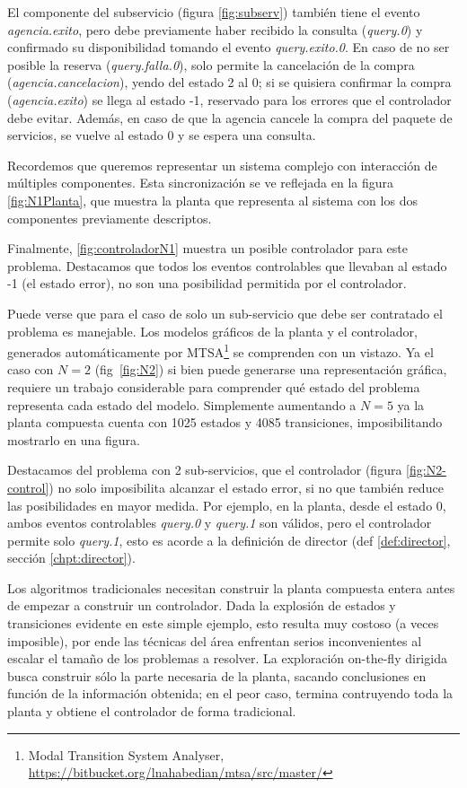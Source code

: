 El componente del subservicio (figura \ref{fig:subserv}) también tiene el evento \textit{agencia.exito}, pero debe previamente haber recibido la consulta (\textit{query.0}) y confirmado su disponibilidad tomando el evento \textit{query.exito.0}. En caso de no ser posible la reserva (\textit{query.falla.0}), solo permite la cancelación de la compra (\textit{agencia.cancelacion}), yendo del estado 2 al 0; si se quisiera confirmar la compra (\textit{agencia.exito}) se llega al estado -1, reservado para los errores que el controlador debe evitar. Además, en caso de que la agencia cancele la compra del paquete de servicios, se vuelve al estado 0 y se espera una consulta.

Recordemos que queremos representar un sistema complejo con interacción de múltiples componentes. Esta sincronización se ve reflejada en la figura \ref{fig:N1Planta}, que muestra la planta que representa al sistema con los dos componentes previamente descriptos. 

Finalmente, \ref{fig:controladorN1} muestra un posible controlador para este problema. Destacamos que todos los eventos controlables que llevaban al estado -1 (el estado error), no son una posibilidad permitida por el controlador. 

Puede verse que para el caso de solo un sub-servicio que debe ser contratado el problema es manejable. Los modelos gráficos de la planta y el controlador, generados automáticamente por MTSA\footnote{Modal Transition System Analyser, \href{https://bitbucket.org/lnahabedian/mtsa/src/master/^}{https://bitbucket.org/lnahabedian/mtsa/src/master/}} se comprenden con un vistazo. Ya el caso con $N=2$ (fig~\ref{fig:N2}) si bien puede generarse una representación gráfica, requiere un trabajo considerable para comprender qué estado del problema representa cada estado del modelo. Simplemente aumentando a $N=5$ ya la planta compuesta cuenta con 1025 estados y 4085 transiciones, imposibilitando mostrarlo en una figura. 

Destacamos del problema con 2 sub-servicios, que el controlador (figura \ref{fig:N2-control}) no solo imposibilita alcanzar el estado error, si no que también reduce las posibilidades en mayor medida. Por ejemplo, en la planta, desde el estado 0, ambos eventos controlables \textit{query.0} y \textit{query.1} son válidos, pero el controlador permite solo \textit{query.1}, esto es acorde a la definición de director (def \ref{def:director}, sección \ref{chpt:director}).

Los algoritmos tradicionales necesitan construir la planta compuesta entera antes de empezar a construir un controlador. Dada la explosión de estados y transiciones evidente en este simple ejemplo, esto resulta muy costoso (a veces imposible), por ende las técnicas del área enfrentan serios inconvenientes al escalar el tamaño de los problemas a resolver. La exploración on-the-fly dirigida busca construir sólo la parte  necesaria de la planta, sacando conclusiones en función de la información obtenida; en el peor caso, termina contruyendo toda la planta y obtiene el controlador de forma tradicional.








